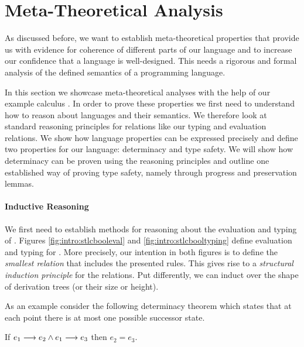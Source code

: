 {%
\section{Meta-Theoretical Analysis}\label{sec:intro:typesafety}


As discussed before, we want to establish meta-theoretical properties that
provide us with evidence for coherence of different parts of our language and to
increase our confidence that a language is well-designed. This needs a rigorous
and formal analysis of the defined semantics of a programming language.

In this section we showcase meta-theoretical analyses with the help of our
example calculus \stlcbool. In order to prove these properties we first need to
understand how to reason about languages and their semantics. We therefore look
at standard reasoning principles for relations like our typing and evaluation
relations. We show how language properties can be expressed precisely and define
two properties for our language: determinacy and type safety. We will show how
determinacy can be proven using the reasoning principles and outline one
established way of proving type safety, namely through progress and preservation
lemmas.


\paragraph{Inductive Reasoning}
We first need to establish methods for reasoning about the evaluation and typing
of \stlcbool. Figures \ref{fig:intro:stlcbooleval} and
\ref{fig:intro:stlcbooltyping} define evaluation and typing for \stlcbool. More
precisely, our intention in both figures is to define the \emph{smallest
  relation} that includes the presented rules. This gives rise to a
\emph{structural induction principle} for the relations. Put differently, we can
induct over the shape of derivation trees (or their size or height).

As an example consider the following determinacy theorem which states that
at each point there is at most one possible successor state.
\begin{thm}[Determinacy]
  If ${e_1} \longrightarrow {e_2} \wedge {e_1} \longrightarrow {e_3}$ then $e_2 = e_3$.
\end{thm}

}
